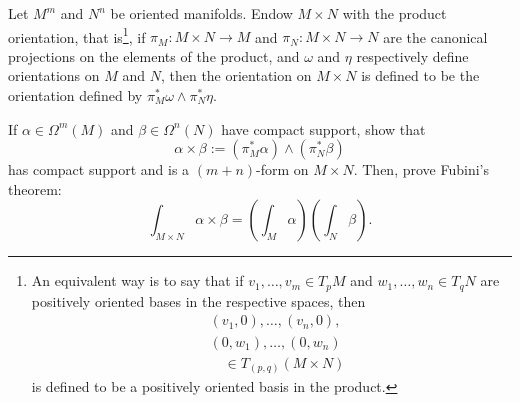 \begin{exercise}\label{exe:fubini}
  Let $M^m$ and $N^n$ be oriented manifolds. Endow $M\times N$ with the product orientation, that is\footnote{An equivalent way is to say that if $v_1,\ldots,v_m\in T_pM$ and $w_1, \ldots, w_n\in T_q N$ are positively oriented bases in the respective spaces, then \begin{align}
    &(v_1,0),\ldots,(v_n,0),\\
    &(0,w_1), \ldots, (0,w_n)\\
    &\quad\in T_{(p,q)}(M\times N)
\end{align}
is defined to be a positively oriented basis in the product.}, if $\pi_M : M\times N \to M$ and $\pi_N: M\times N \to N$ are the canonical projections on the elements of the product, and $\omega$ and $\eta$ respectively define orientations on $M$ and $N$, then the orientation on $M\times N$ is defined to be the orientation defined by $\pi_M^* \omega \wedge \pi_N^* \eta$.

  If $\alpha\in\Omega^m(M)$ and $\beta\in\Omega^n(N)$ have compact support, show that
  \begin{equation}
    \alpha\times\beta := (\pi_M^*\alpha)\wedge(\pi_N^*\beta)
  \end{equation}
  has compact support and is a $(m+n)$-form on $M\times N$.
  Then, prove Fubini's theorem:
  \begin{equation}
    \int_{M\times N}\alpha\times\beta = \left(\int_M\alpha\right)\left(\int_N\beta\right).
  \end{equation}
\end{exercise}

